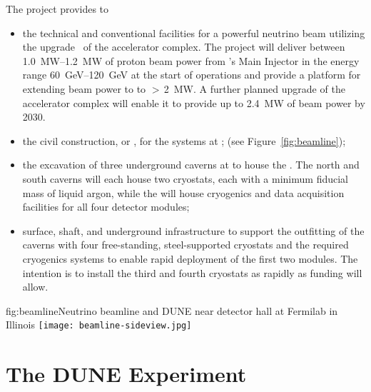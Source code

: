 The  project provides to 
\begin{itemize}
\item  the  technical and conventional facilities for a powerful neutrino beam utilizing the  upgrade~\cite{pip2-2013} of the  accelerator 
complex. The  project will deliver between \SIrange{1.0}{1.2}{MW} of proton beam power from 's Main Injector in the energy range  \SIrange{60}{120}{GeV} at the start of  operations and provide a platform for extending beam power to  to %
$>\,$\SI{2}{MW}. %
A further planned upgrade 
of the accelerator complex will enable it to provide up to \SI{2.4}{\MW} of beam power by 2030. 

\item  the civil construction, or , for the  systems at ; (see Figure~\ref{fig:beamline});

\item the excavation of three underground caverns at  to house the  . The north and south caverns will each house two cryostats, each with a
 minimum \nominalmodsize fiducial mass of liquid argon, while the  will house cryogenics and data acquisition facilities for all four detector modules;

\item surface, shaft, and underground infrastructure to support 
the outfitting of the caverns with four free-standing, steel-supported cryostats 
and the required cryogenics systems to enable rapid deployment of the first two \nominalmodsize {} modules. 
The intention is to install the third and fourth cryostats as rapidly as funding will 
allow.

\end{itemize}


\begin{dunefigure}{fig:beamline}{Neutrino beamline and DUNE near detector hall at Fermilab in Illinois}
\texttt{[image: beamline-sideview.jpg]}
\end{dunefigure}



\section{The DUNE Experiment}

